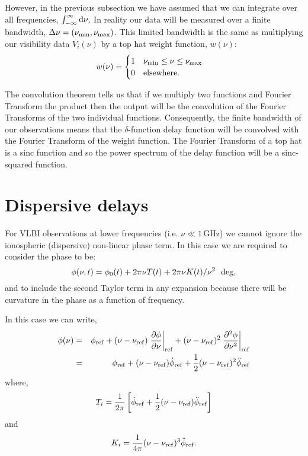 \documentclass{tufte-handout}
\begin{document}
However, in the previous subsection we have assumed that we can integrate over all frequencies, $\int_{-\infty}^{\infty}{{\rm d}\nu}$. In reality our data will be measured over a finite bandwidth, $\Delta \nu = (\nu_{\rm min},\nu_{\rm max})$. This limited bandwidth is the same as multiplying our visibility data $V_i(\nu)$ by a top hat weight function, $w(\nu)$:
%
\begin{align*}
  w(\nu) & =
  \begin{cases}
   1 & \nu_{\rm min} \leq \nu \leq \nu_{\rm max}\\
   0 & {\rm elsewhere}.
  \end{cases}
 \end{align*}

The convolution theorem tells us that if we multiply two functions and Fourier Transform the product then the output will be the convolution of the Fourier Transforms of the two individual functions. Consequently, the finite bandwidth of our observations means that the $\delta$-function delay function will be convolved with the Fourier Transform of the weight function. The Fourier Transform of a top hat is a sinc function and so the power spectrum of the delay function will be a sinc-squared function.

\section{Dispersive delays}

For VLBI observations at lower frequencies (i.e. $\nu \ll 1$\,GHz) we cannot ignore the ionospheric (dispersive) non-linear phase term. In this case we are required to consider the phase to be:
%
\begin{equation}
\phi(\nu, t) = \phi_0(t) + 2\pi\nu T(t) + 2\pi \nu K(t)/\nu^2~~{\rm deg},
\end{equation}
% 
and to include the second Taylor term in any expansion because there will be curvature in the phase as a function of frequency.

\noindent
In this case we can write,
%
\begin{eqnarray}
\nonumber \phi(\nu) &=& \phi_{\rm ref} + (\nu - \nu_{\rm ref}) \left. \frac{\partial \phi}{\partial \nu} \right|_{\rm ref} + (\nu - \nu_{\rm ref})^2 \left. \frac{\partial^2 \phi}{\partial \nu^2} \right|_{\rm ref} \\
\nonumber &=& \phi_{\rm ref} + (\nu - \nu_{\rm ref}) \dot{\phi}_{\rm ref} + \frac{1}{2}(\nu - \nu_{\rm ref})^2 \ddot{\phi}_{\rm ref}
\end{eqnarray}
%
where,
%
\begin{equation}
T_i = \frac{1}{2\pi}\left[\dot{\phi}_{\rm ref} + \frac{1}{2}(\nu - \nu_{\rm ref})\ddot{\phi}_{\rm ref}\right]
\end{equation}
%
and
%
\begin{equation}
K_i = \frac{1}{4\pi}(\nu - \nu_{\rm ref})^3\ddot{\phi}_{\rm ref}.
\end{equation}
\end{document}
